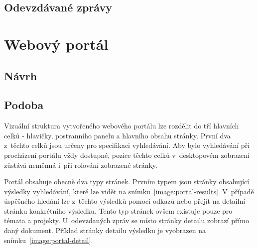 \subsection{Odevzdávané zprávy}
\blindtext



\section{Webový portál}
\blindtext

\subsection{Návrh}
\blindtext

\subsection{Podoba}
Vizuální struktura vytvořeného webového portálu lze rozdělit do tří hlavních celků - hlavičky, postranního panelu a hlavního obsahu stránky. První dva z~těchto celků jsou určeny pro specifikaci vyhledávání. Aby bylo vyhledávání při procházení portálu vždy dostupné, pozice těchto celků v~desktopovém zobrazení zůstává neměnná i~při rolování zobrazené stránky.

Portál obsahuje obecně dva typy stránek. Prvním typem jsou stránky obsahující výsledky vyhledávání, které lze vidět na snímku~\ref{image:portal-results}. V~případě úspěšného hledání lze z~těchto výsledků pomocí odkazů  nebo  přejít na detailní stránku konkrétního výsledku. Tento typ stránek ovšem existuje pouze pro témata a projekty. U~odevzdaných zpráv se místo stránky detailu zobrazí přímo daný dokument. Příklad stránky detailu výsledku je vyobrazen na snímku~\ref{image:portal-detail}.

